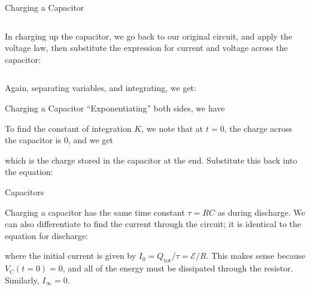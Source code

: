 \documentclass[12pt,aspectratio=169]{beamer}
\begin{document}
\begin{frame}{Charging a Capacitor}
  \begin{columns}
    \centering
    
    In charging up the capacitor, we go back to our original circuit, and apply
    the voltage law, then substitute the expression for current and voltage
    across the capacitor:

  \end{columns}
  \vspace{.2in}Again, separating variables, and integrating, we get:

 \end{frame}



\begin{frame}{Charging a Capacitor}
  ``Exponentiating'' both sides, we have
  

  To find the constant of integration $K$, we note that at $t=0$, the charge
  across the capacitor is $0$, and we get


  which is the charge stored in the capacitor at the end. Substitute this back
  into the equation:

\end{frame}




\begin{frame}{Capacitors}


  Charging a capacitor has the same time constant $\tau=RC$ as during
  discharge. We can also differentiate to find the current through the circuit;
  it is identical to the equation for discharge:


  where the initial current is given by $I_0=Q_\text{tot}/\tau=\mathcal E/R$.
  This makes sense because $V_C(t=0)=0$, and all of the energy must be
  dissipated through the resistor. Similarly, $I_\infty=0$.
\end{frame}
\end{document}
